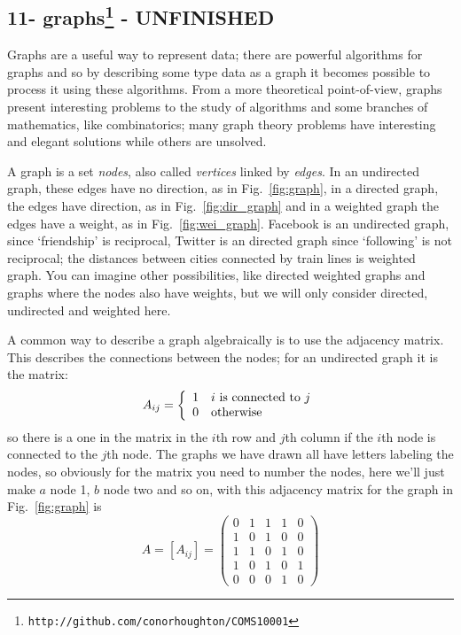 \documentclass[11pt,a4paper]{scrartcl}
\begin{document}
\subsection*{11- graphs\footnote{\texttt{http://github.com/conorhoughton/COMS10001}} - UNFINISHED}

Graphs are a useful way to represent data; there are powerful
algorithms for graphs and so by describing some type data as a graph
it becomes possible to process it using these algorithms. From a more
theoretical point-of-view, graphs present interesting problems to the
study of algorithms and some branches of mathematics, like
combinatorics; many graph theory problems have interesting and elegant
solutions while others are unsolved.

A graph is a set \textsl{nodes}, also called \textsl{vertices} linked
by \textsl{edges}. In an undirected graph, these edges have no
direction, as in Fig.~\ref{fig:graph}, in a directed graph, the edges
have direction, as in Fig.~\ref{fig:dir_graph} and in a weighted graph
the edges have a weight, as in Fig.~\ref{fig:wei_graph}. Facebook is
an undirected graph, since \lq{}friendship\rq{} is reciprocal, Twitter
is an directed graph since \lq{}following\rq{} is not reciprocal; the
distances between cities connected by train lines is weighted
graph. You can imagine other possibilities, like directed weighted
graphs and graphs where the nodes also have weights, but we will only
consider directed, undirected and weighted here.

A common way to describe a graph algebraically is to use the adjacency
matrix. This describes the connections between the nodes; for an undirected graph it is the matrix:
\begin{equation}
A_{ij}=\left\{\begin{array}{cl}1&i\mbox{ is connected to }j\cr0&\mbox{otherwise}
\end{array}\right.
\end{equation}
so there is a one in the matrix in the $i$th row and $j$th column if
the $i$th node is connected to the $j$th node. The graphs we have
drawn all have letters labeling the nodes, so obviously for the matrix
you need to number the nodes, here we'll just make $a$ node 1, $b$ node two and so on, with this adjacency matrix for the graph in Fig.~\ref{fig:graph} is
\begin{equation}
A=[A_{ij}]=\left(
\begin{array}{ccccc}
0&1&1&1&0\\
1&0&1&0&0\\
1&1&0&1&0\\
1&0&1&0&1\\
0&0&0&1&0
\end{array}
\right)
\end{equation}
\end{document}
